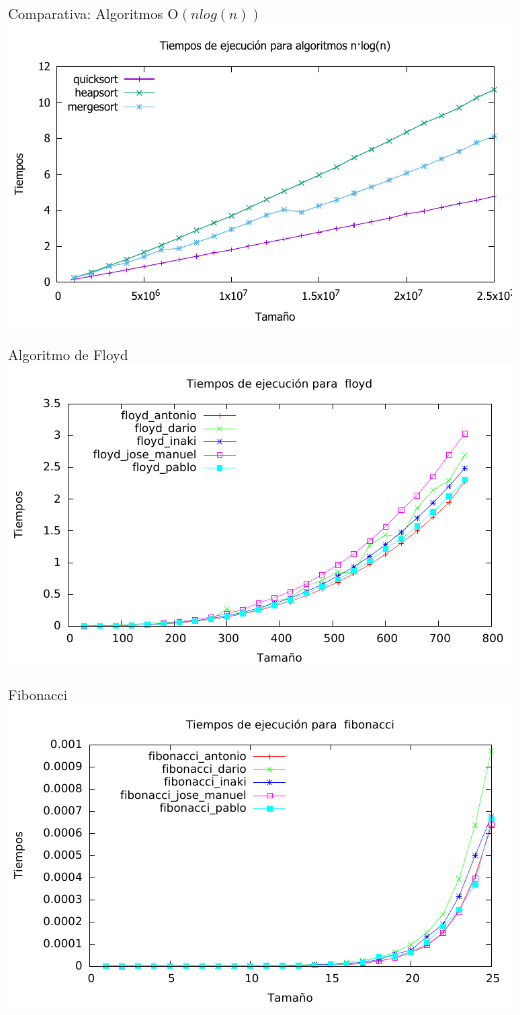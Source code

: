 \documentclass[10pt,compress,usetitleprogressbar,mathserif]{beamer}
\begin{document}
\begin{frame}{Comparativa: Algoritmos O$(nlog(n))$}
		\includegraphics[width = \textwidth ]{comparativa_logaritmicos_g}
\end{frame}

\begin{frame}{Algoritmo de Floyd}
		\includegraphics[width = \textwidth ]{floyd_todos_g}
\end{frame}

\begin{frame}{Fibonacci}
		\includegraphics[width = \textwidth ]{fibonacci_todos_g}
\end{frame}
\end{document}
